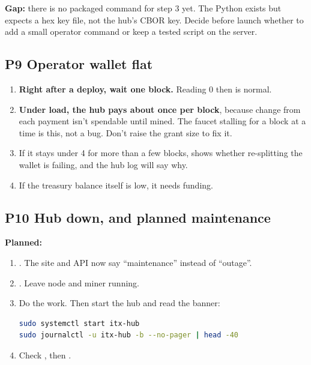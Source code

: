 \documentclass[11pt]{article}
\begin{document}
\textbf{Gap:} there is no packaged command for step 3 yet. The Python  exists but expects a hex key file, not the hub's CBOR key. Decide before launch whether to add a small operator command or keep a tested script on the server.

\subsection{P9 Operator wallet flat}

\begin{enumerate}[leftmargin=1.5em]
  \item \textbf{Right after a deploy, wait one block.} Reading 0 then is normal.
  \item \textbf{Under load, the hub pays about once per block}, because change from each payment isn't spendable until mined. The faucet stalling for a block at a time is this, not a bug. Don't raise the grant size to fix it.
  \item If it stays under 4 for more than a few blocks,  shows whether re-splitting the wallet is failing, and the hub log will say why.
  \item If the treasury balance itself is low, it needs funding.
\end{enumerate}

\subsection{P10 Hub down, and planned maintenance}

\textbf{Planned:}
\begin{enumerate}[leftmargin=1.5em]
  \item {}. The site and API now say ``maintenance'' instead of ``outage''.
  \item {}. Leave node and miner running.
  \item Do the work. Then start the hub and read the banner:
\begin{lstlisting}[language=bash]
sudo systemctl start itx-hub
sudo journalctl -u itx-hub -b --no-pager | head -40
\end{lstlisting}
  \item Check , then .
\end{enumerate}
\end{document}
